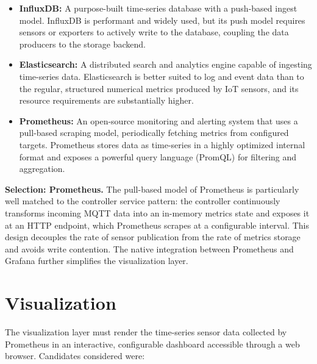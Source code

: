 \begin{itemize}
    \item \textbf{InfluxDB:} A purpose-built time-series database with a push-based ingest model. InfluxDB is performant and widely used, but its push model requires sensors or exporters to actively write to the database, coupling the data producers to the storage backend.
    \item \textbf{Elasticsearch:} A distributed search and analytics engine capable of ingesting time-series data. Elasticsearch is better suited to log and event data than to the regular, structured numerical metrics produced by IoT sensors, and its resource requirements are substantially higher.
    \item \textbf{Prometheus:} An open-source monitoring and alerting system that uses a pull-based scraping model, periodically fetching metrics from configured targets\cite{Jani2024-mg}. Prometheus stores data as time-series in a highly optimized internal format and exposes a powerful query language (PromQL) for filtering and aggregation.
\end{itemize}

\textbf{Selection: Prometheus.} The pull-based model of Prometheus is particularly well matched to the controller service pattern: the controller continuously transforms incoming MQTT data into an in-memory metrics state and exposes it at an HTTP endpoint, which Prometheus scrapes at a configurable interval. This design decouples the rate of sensor publication from the rate of metrics storage and avoids write contention. The native integration between Prometheus and Grafana further simplifies the visualization layer\cite{Pragathi2024-fa}.

\section{Visualization}

The visualization layer must render the time-series sensor data collected by Prometheus in an interactive, configurable dashboard accessible through a web browser. Candidates considered were:

